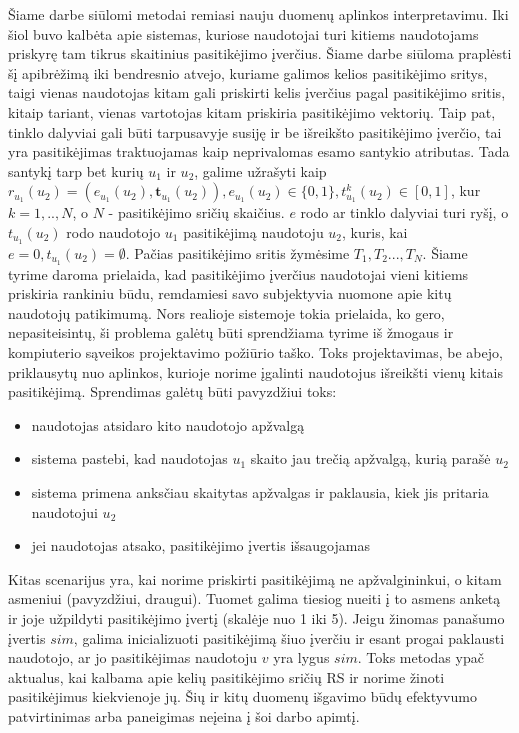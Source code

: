 \documentclass{VUMIFInfMagistrinis}
\begin{document}
Šiame darbe siūlomi metodai remiasi nauju duomenų aplinkos interpretavimu. Iki šiol buvo kalbėta apie sistemas, kuriose naudotojai turi kitiems naudotojams priskyrę tam tikrus skaitinius pasitikėjimo įverčius. Šiame darbe siūloma praplėsti šį apibrėžimą iki bendresnio atvejo, kuriame galimos kelios pasitikėjimo sritys, taigi vienas naudotojas kitam gali priskirti kelis įverčius pagal pasitikėjimo sritis, kitaip tariant, vienas vartotojas kitam priskiria pasitikėjimo vektorių. Taip pat, tinklo dalyviai gali būti tarpusavyje susiję ir be išreikšto pasitikėjimo įverčio, tai yra pasitikėjimas traktuojamas kaip neprivalomas esamo santykio atributas. Tada santykį tarp bet kurių $u_1$ ir $u_2$, galime užrašyti kaip $r_{u_1}({u_2})=(e_{u_1}({u_2}), \boldsymbol{t}_{u_1}({u_2})), e_{u_1}({u_2}) \in \{0,1\}, t_{u_1}^k({u_2})\in[0,1]$, kur $k=1,..,N$, o $N$ - pasitikėjimo sričių skaičius. $e$ rodo ar tinklo dalyviai turi ryšį, o $t_{u_1}({u_2})$ rodo naudotojo $u_1$ pasitikėjimą naudotoju $u_2$, kuris, kai $e=0, t_{u_1}({u_2}) = \emptyset$. Pačias pasitikėjimo sritis žymėsime $T_1, T_2..., T_N$.
\newline
\indent
Šiame tyrime daroma prielaida, kad pasitikėjimo įverčius naudotojai vieni kitiems priskiria rankiniu būdu, remdamiesi savo subjektyvia nuomone apie kitų naudotojų patikimumą. Nors realioje sistemoje tokia prielaida, ko gero, nepasiteisintų, ši problema galėtų būti sprendžiama tyrime iš žmogaus ir kompiuterio sąveikos projektavimo požiūrio taško. Toks projektavimas, be abejo, priklausytų nuo aplinkos, kurioje norime įgalinti naudotojus išreikšti vienų kitais pasitikėjimą. Sprendimas galėtų būti pavyzdžiui toks: 
\begin{itemize}
	\item naudotojas atsidaro kito naudotojo apžvalgą
	\item sistema pastebi, kad naudotojas $u_1$ skaito jau trečią apžvalgą, kurią parašė $u_2$
	\item sistema primena anksčiau skaitytas apžvalgas ir paklausia, kiek jis pritaria naudotojui $u_2$
	\item jei naudotojas atsako, pasitikėjimo įvertis išsaugojamas
\end{itemize}
\indent
Kitas scenarijus yra, kai norime priskirti pasitikėjimą ne apžvalgininkui, o kitam asmeniui (pavyzdžiui, draugui). Tuomet galima tiesiog nueiti į to asmens anketą ir joje užpildyti pasitikėjimo įvertį (skalėje nuo 1 iki 5).
\indent
Jeigu žinomas panašumo įvertis $sim$, galima inicializuoti pasitikėjimą šiuo įverčiu ir esant progai paklausti naudotojo, ar jo pasitikėjimas naudotoju $v$ yra lygus $sim$. Toks metodas ypač aktualus, kai kalbama apie kelių pasitikėjimo sričių RS ir norime žinoti pasitikėjimus kiekvienoje jų. Šių ir kitų duomenų išgavimo būdų efektyvumo patvirtinimas arba paneigimas neįeina į šoi darbo apimtį.
\end{document}
